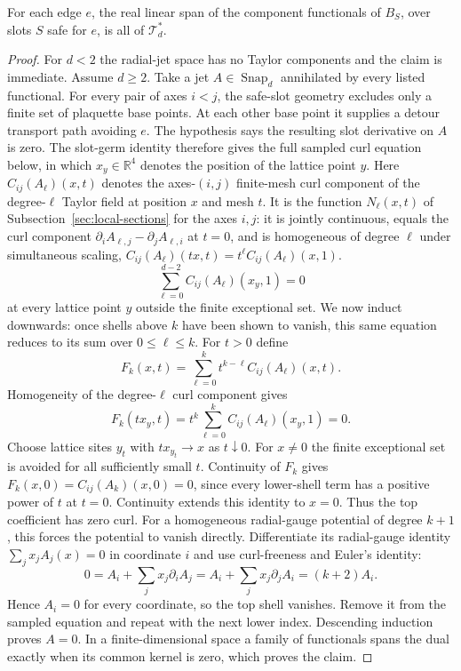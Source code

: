 \begin{lemma}\label{lem:marked-safe-span}
For each edge $e$, the real linear span of the component functionals of
$B_S$, over slots $S$ safe for $e$, is all of $\mathcal T_d^*$.
\end{lemma}
\begin{proof}
For $d<2$ the radial-jet space has no Taylor components and the claim is
immediate. Assume $d\geq2$.
Take a jet $A\in\operatorname{Snap}_d$ annihilated by every listed
functional. For every pair of axes $i<j$, the safe-slot geometry excludes
only a finite set of plaquette base points. At each other base point it
supplies a detour transport path avoiding $e$. The hypothesis says the
resulting slot derivative on $A$ is zero. The slot-germ identity therefore
gives the full sampled curl equation below, in which $x_y\in\mathbb R^4$
denotes the position of the lattice point $y$. Here
$C_{ij}(A_\ell)(x,t)$ denotes the axes-$(i,j)$ finite-mesh curl component
of the degree-$\ell$ Taylor field at position $x$ and mesh $t$. It is the
function $N_\ell(x,t)$ of Subsection~\ref{sec:local-sections} for the axes
$i,j$: it is jointly continuous, equals the curl component
$\partial_iA_{\ell,j}-\partial_jA_{\ell,i}$ at $t=0$, and is homogeneous
of degree $\ell$ under simultaneous scaling,
$C_{ij}(A_\ell)(tx,t)=t^\ell C_{ij}(A_\ell)(x,1)$.
\[
       \sum_{\ell=0}^{d-2}C_{ij}(A_\ell)(x_y,1)=0
\]
at every lattice point $y$ outside the finite exceptional set. We now
induct downwards: once shells above $k$ have been shown to vanish, this
same equation reduces to its sum over $0\leq\ell\leq k$. For $t>0$ define
\[
 F_k(x,t)=\sum_{\ell=0}^{k}
              t^{k-\ell}C_{ij}(A_\ell)(x,t).
\]
Homogeneity of the degree-$\ell$ curl component gives
\[
 F_k(t x_y,t)=t^k\sum_{\ell=0}^k C_{ij}(A_\ell)(x_y,1)=0.
\]
Choose lattice sites $y_t$ with $t x_{y_t}\to x$ as $t\downarrow0$.
For $x\ne0$ the
finite exceptional set is avoided for all sufficiently small $t$.
Continuity of $F_k$ gives
$F_k(x,0)=C_{ij}(A_k)(x,0)=0$, since every lower-shell
term has a positive power of $t$ at $t=0$. Continuity extends this
identity to $x=0$. Thus the top coefficient has zero curl. For a
homogeneous radial-gauge potential of degree $k+1$, this forces the
potential to vanish directly. Differentiate its radial-gauge identity
$\sum_jx_jA_j(x)=0$ in coordinate $i$ and use curl-freeness and Euler's
identity:
\[
 0=A_i+\sum_jx_j\partial_iA_j
   =A_i+\sum_jx_j\partial_jA_i=(k+2)A_i.
\]
Hence $A_i=0$ for every coordinate, so the top shell vanishes. Remove it
from the sampled equation and repeat with the next lower index. Descending
induction proves $A=0$. In a finite-dimensional space a family of
functionals spans the dual exactly when its common kernel is zero, which
proves the claim.
\end{proof}

